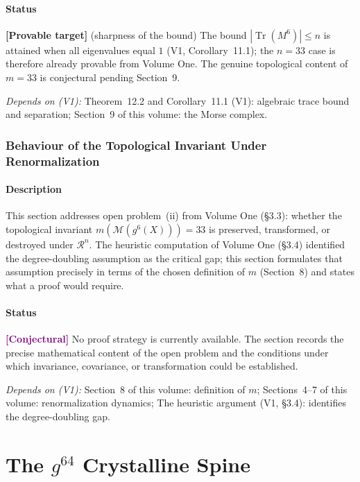 \documentclass[11pt]{article}
\newcommand{\provable}{\textcolor{blue!70!black}{\textbf{[Provable target]}}}
\newcommand{\conjectural}{\textcolor{purple}{\textbf{[Conjectural]}}}
\newcommand{\depends}[1]{\smallskip\noindent\textit{Depends on (V1):} #1.\smallskip}
\begin{document}
\subsection*{Status}
\provable{} (sharpness of the bound) The bound $|\operatorname{Tr}(M^6)| \le n$
is attained when all eigenvalues equal $1$ (V1, Corollary~11.1); the
$n = 33$ case is therefore already provable from Volume One. The genuine
topological content of $m = 33$ is conjectural pending Section~9.

\depends{Theorem~12.2 and Corollary~11.1 (V1):
algebraic trace bound and separation;
Section~9 of this volume: the Morse complex}

\section{Behaviour of the Topological Invariant Under Renormalization}

\subsection*{Description}
This section addresses open problem~(ii) from Volume One (\S3.3): whether
the topological invariant $m(\mathcal{M}(g^6(X))) = 33$ is preserved,
transformed, or destroyed under $\mathcal{R}^n$. The heuristic computation
of Volume One (\S3.4) identified the degree-doubling assumption as the
critical gap; this section formulates that assumption precisely in terms of
the chosen definition of $m$ (Section~8) and states what a proof would
require.

\subsection*{Status}
\conjectural{} No proof strategy is currently available. The section
records the precise mathematical content of the open problem and the
conditions under which invariance, covariance, or transformation could be
established.

\depends{Section~8 of this volume: definition of $m$;
Sections~4--7 of this volume: renormalization dynamics;
The heuristic argument (V1, \S3.4): identifies the degree-doubling gap}

\part{The $g^{64}$ Crystalline Spine}
\end{document}
